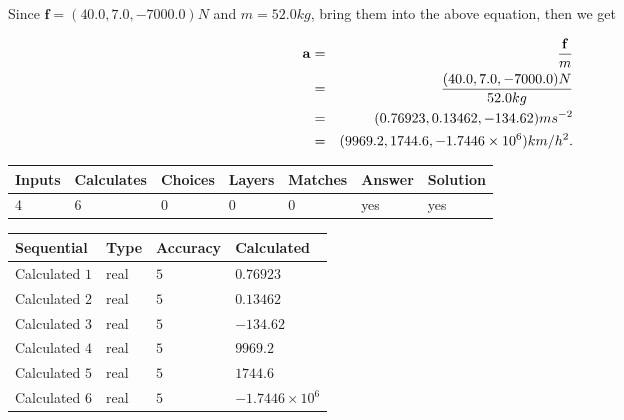 \documentclass[12pt]{article}
\begin{document}
Since $\mathbf{f}=( %
40.0,  %
7.0,  %
-7000.0 )N$
and $m= %
52.0 kg$, bring them into the above equation, then we get
 
\begin{eqnarray*}
\mathbf{a}&=&\frac{\mathbf{f}}m  \\
&=&\frac{(
40.0 ,
7.0 ,
-7000.0 )N
}{ %
52.0 kg}  \\
&=&(
0.76923 ,
0.13462,
-134.62
)ms^{-2} \\
&=&(
9969.2 ,
1744.6 ,
-1.7446 \times 10^{6}
)km/h^2.
\end{eqnarray*}
 
 
 
\noindent{}
 
 

 
\vspace{0.3in}
   
   
   
   
\noindent\begin{tabular}{|l|l|l|l|l|l|l|}
 \hline
Inputs & Calculates & Choices & Layers & Matches & Answer & Solution \\ \hline
           4  & 
           6  & 
           0
  & 
           0  & 
           0  & 
  yes & 
  yes 
  \\ \hline
 \end{tabular}
   
   
   
   
\noindent{}
   
   
  
  
\noindent\begin{tabular}{|l|l|l|l|}
\hline
 Sequential & Type & Accuracy & Calculated \\ 
\hline
 
 
  Calculated $            1 $ & real & $            5  $ & 
 $ 0.76923 $ 
 \\  \hline  
 
 
  Calculated $            2 $ & real & $            5  $ & 
 $ 0.13462 $ 
 \\  \hline  
 
 
  Calculated $            3 $ & real & $            5  $ & 
 $ -134.62 $ 
 \\  \hline  
 
 
  Calculated $            4 $ & real & $            5  $ & 
 $ 9969.2 $ 
 \\  \hline  
 
 
  Calculated $            5 $ & real & $            5  $ & 
 $ 1744.6 $ 
 \\  \hline  
 
 
  Calculated $            6 $ & real & $            5  $ & 
 $ -1.7446 \times 10^{6} $ 
 \\  \hline  
 \end{tabular}
   
\end{document}
